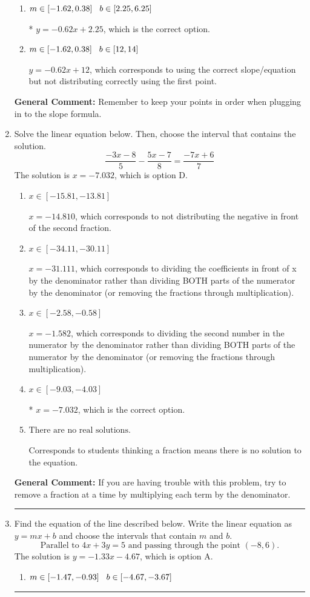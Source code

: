 \documentclass{extbook}[14pt]
\newcommand{\litem}[1]{\item #1

\rule{\textwidth}{0.4pt}}
\begin{document}
\begin{enumerate}
{\begin{enumerate}[label=\Alph*.]
 $y = -0.62x -14$, which corresponds to using the correct slope/equation but not distributing correctly using the second point.
\item \( m \in [-1.62, 0.38] \hspace*{3mm} b \in [2.25, 6.25] \)

* $y = -0.62x + 2.25$, which is the correct option.
\item \( m \in [-1.62, 0.38] \hspace*{3mm} b \in [12, 14] \)

 $y = -0.62x + 12$, which corresponds to using the correct slope/equation but not distributing correctly using the first point.
\end{enumerate}

\textbf{General Comment:} Remember to keep your points in order when plugging in to the slope formula.
}
\litem{
Solve the linear equation below. Then, choose the interval that contains the solution.
\[ \frac{-3x -8}{5} - \frac{5x -7}{8} = \frac{-7x + 6}{7} \]
The solution is \( x = -7.032 \), which is option D.\begin{enumerate}[label=\Alph*.]
\item \( x \in [-15.81, -13.81] \)

 $x = -14.810$, which corresponds to not distributing the negative in front of the second fraction.
\item \( x \in [-34.11, -30.11] \)

 $x = -31.111$, which corresponds to dividing the coefficients in front of x by the denominator rather than dividing BOTH parts of the numerator by the denominator (or removing the fractions through multiplication).
\item \( x \in [-2.58, -0.58] \)

 $x = -1.582$, which corresponds to dividing the second number in the numerator by the denominator rather than dividing BOTH parts of the numerator by the denominator (or removing the fractions through multiplication).
\item \( x \in [-9.03, -4.03] \)

* $x = -7.032$, which is the correct option.
\item \( \text{There are no real solutions.} \)

Corresponds to students thinking a fraction means there is no solution to the equation.
\end{enumerate}

\textbf{General Comment:} If you are having trouble with this problem, try to remove a fraction at a time by multiplying each term by the denominator.
}
\litem{
Find the equation of the line described below. Write the linear equation as $ y=mx+b $ and choose the intervals that contain $m$ and $b$.
\[ \text{Parallel to } 4 x + 3 y = 5 \text{ and passing through the point } (-8, 6). \]
The solution is \( y = -1.33x - 4.67 \), which is option A.\begin{enumerate}[label=\Alph*.]
\item \( m \in [-1.47, -0.93] \hspace*{3mm} b \in [-4.67, -3.67] \)


\end{enumerate}}
\end{enumerate}
\end{document}
